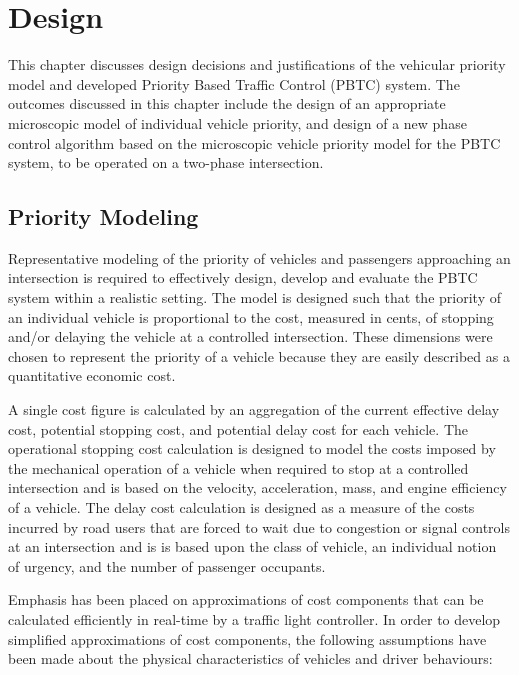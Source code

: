 \chapter{Design}
\label{chapter:design}

This chapter discusses design decisions and justifications of the vehicular priority model and developed Priority Based Traffic Control (PBTC) system. The outcomes discussed in this chapter include the design of an appropriate microscopic model of individual vehicle priority, and design of a new phase control algorithm based on the microscopic vehicle priority model for the PBTC system, to be operated on a two-phase intersection. 

\section{Priority Modeling}

Representative modeling of the priority of vehicles and passengers approaching an intersection is required to effectively design, develop and evaluate the PBTC system within a realistic setting. The model is designed such that the priority of an individual vehicle is proportional to the cost, measured in cents, of stopping and/or delaying the vehicle at a controlled intersection. These dimensions were chosen to represent the priority of a vehicle because they are easily described as a quantitative economic cost. 

A single cost figure is calculated by an aggregation of the current effective delay cost, potential stopping cost, and potential delay cost for each vehicle. The operational stopping cost calculation is designed to model the costs imposed by the mechanical operation of a vehicle when required to stop at a controlled intersection and is based on the velocity, acceleration, mass, and engine efficiency of a vehicle. The delay cost calculation is designed as a measure of the costs incurred by road users that are forced to wait due to congestion or signal controls at an intersection and is is based upon the class of vehicle, an individual notion of urgency, and the number of passenger occupants.

Emphasis has been placed on approximations of cost components that can be calculated efficiently in real-time by a traffic light controller. In order to develop simplified approximations of cost components, the following assumptions have been made about the physical characteristics of vehicles and driver behaviours:

